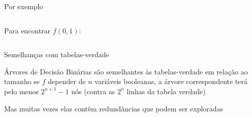 \expandafter\documentclass\expandafter[table, usenames, svgnames, dvipsnames,14pt, \classopts]{beamer}
\begin{document}
\begin{frame}{Por exemplo}
\begin{columns}[c]
\begin{outline}
                \vspace{1em}
               
                \1 Para encontrar $f(0,1)$:
            \end{outline}
    
    \end{columns}
            
\end{frame}

\begin{frame}{Semelhanças com tabelas-verdade}

    \begin{outline}
        \1 Árvores de Decisão Binárias são semelhantes às tabelas-verdade em relação ao tamanho
            \2[-] se $f$ depender de $n$ variáveis booleanas, a árvore correspondente terá pelo menos $2^{n+1}-1$ nós (contra as $2^n$ linhas da tabela verdade)
        
        \vspace{1em}
        
        \1 Mas muitas vezes elas contêm redundâncias que podem ser exploradas
    \end{outline}      

    \setlength{\fboxsep}{-5pt}
    \setlength{\parfillskip}{-5pt plus 0em}
    
\end{frame}
\end{document}
